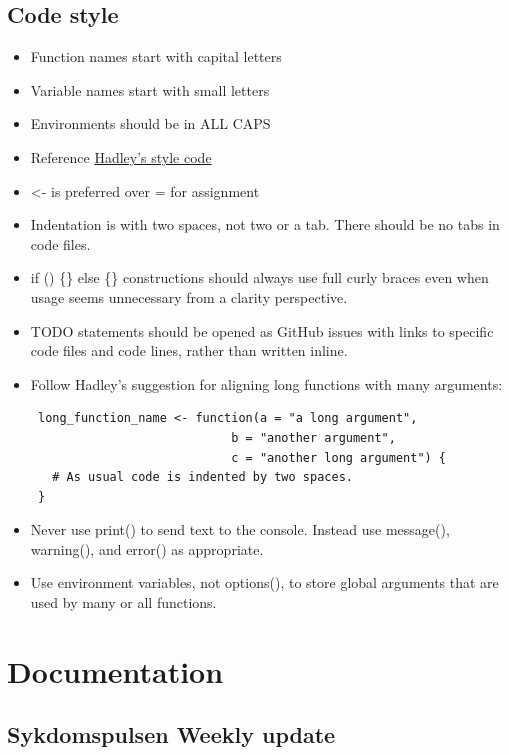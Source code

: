 \documentclass[12pt,]{article}
\theoremstyle{definition}
\theoremstyle{definition}
\theoremstyle{definition}
\theoremstyle{remark}
\begin{document}
\subsection{Code style}\label{code-style}

\begin{itemize}
\item
  Function names start with capital letters
\item
  Variable names start with small letters
\item
  Environments should be in ALL CAPS
\item
  Reference \href{http://adv-r.had.co.nz/Style.html}{Hadley's style
  code}
\item
  \textless{}- is preferred over = for assignment
\item
  Indentation is with two spaces, not two or a tab. There should be no
  tabs in code files.
\item
  if () \{\} else \{\} constructions should always use full curly braces
  even when usage seems unnecessary from a clarity perspective.
\item
  TODO statements should be opened as GitHub issues with links to
  specific code files and code lines, rather than written inline.
\item
  Follow Hadley's suggestion for aligning long functions with many
  arguments:

\begin{verbatim}
 long_function_name <- function(a = "a long argument", 
                            b = "another argument",
                            c = "another long argument") {
   # As usual code is indented by two spaces.
 }
\end{verbatim}
\item
  Never use print() to send text to the console. Instead use message(),
  warning(), and error() as appropriate.
\item
  Use environment variables, not options(), to store global arguments
  that are used by many or all functions.
\end{itemize}

\section{Documentation}\label{documentation}

\subsection{Sykdomspulsen Weekly
update}\label{sykdomspulsen-weekly-update}
\end{document}
